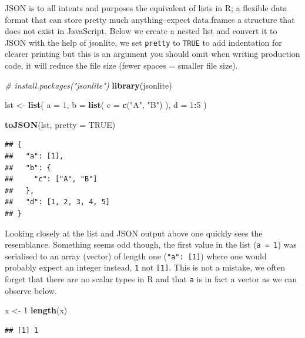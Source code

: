 \documentclass[
]{krantz}
\makeatletter
\newenvironment{Shaded}{\begin{snugshade}}{\end{snugshade}}
\newcommand{\CommentTok}[1]{\textcolor[rgb]{0.37,0.37,0.37}{\textit{#1}}}
\newcommand{\DataTypeTok}[1]{\textcolor[rgb]{0.27,0.27,0.27}{#1}}
\newcommand{\DecValTok}[1]{\textcolor[rgb]{0.06,0.06,0.06}{#1}}
\newcommand{\KeywordTok}[1]{\textcolor[rgb]{0.27,0.27,0.27}{\textbf{#1}}}
\newcommand{\NormalTok}[1]{#1}
\newcommand{\OperatorTok}[1]{\textcolor[rgb]{0.43,0.43,0.43}{\textbf{#1}}}
\newcommand{\OtherTok}[1]{\textcolor[rgb]{0.37,0.37,0.37}{#1}}
\newcommand{\StringTok}[1]{\textcolor[rgb]{0.5,0.5,0.5}{#1}}
\newenvironment{kframe}{%
\medskip{}
\setlength{\fboxsep}{.8em}
 \def\at@end@of@kframe{}%
 \ifinner\ifhmode%
  \def\at@end@of@kframe{\end{minipage}}%
  \begin{minipage}{\columnwidth}%
 \fi\fi%
 \def\FrameCommand##1{\hskip\@totalleftmargin \hskip-\fboxsep
 \colorbox{shadecolor}{##1}\hskip-\fboxsep
     \hskip-\linewidth \hskip-\@totalleftmargin \hskip\columnwidth}%
 \MakeFramed {\advance\hsize-\width
   \@totalleftmargin\z@ \linewidth\hsize
   \@setminipage}}%
 {\par\unskip\endMakeFramed%
 \at@end@of@kframe}
\renewenvironment{Shaded}{\begin{kframe}}{\end{kframe}}
\makeatother
\begin{document}
JSON is to all intents and purposes the equivalent of lists in R; a flexible data format that can store pretty much anything--expect data.frames a structure that does not exist in JavaScript. Below we create a nested list and convert it to JSON with the help of jsonlite, we set \texttt{pretty} to \texttt{TRUE} to add indentation for clearer printing but this is an argument you should omit when writing production code, it will reduce the file size (fewer spaces = smaller file size).

\begin{Shaded}
\begin{Highlighting}[]
\CommentTok{\# install.packages("jsonlite")}
\KeywordTok{library}\NormalTok{(jsonlite)}

\NormalTok{lst \textless{}{-}}\StringTok{ }\KeywordTok{list}\NormalTok{(}
  \DataTypeTok{a =} \DecValTok{1}\NormalTok{,}
  \DataTypeTok{b =} \KeywordTok{list}\NormalTok{(}
    \DataTypeTok{c =} \KeywordTok{c}\NormalTok{(}\StringTok{"A"}\NormalTok{, }\StringTok{"B"}\NormalTok{)}
\NormalTok{  ),}
  \DataTypeTok{d =} \DecValTok{1}\OperatorTok{:}\DecValTok{5}
\NormalTok{)}

\KeywordTok{toJSON}\NormalTok{(lst, }\DataTypeTok{pretty =} \OtherTok{TRUE}\NormalTok{)}
\end{Highlighting}
\end{Shaded}

\begin{verbatim}
## {
##   "a": [1],
##   "b": {
##     "c": ["A", "B"]
##   },
##   "d": [1, 2, 3, 4, 5]
## }
\end{verbatim}

Looking closely at the list and JSON output above one quickly sees the resemblance. Something seems odd though, the first value in the list (\texttt{a\ =\ 1}) was serialised to an array (vector) of length one (\texttt{"a":\ {[}1{]}}) where one would probably expect an integer instead, \texttt{1} not \texttt{{[}1{]}}. This is not a mistake, we often forget that there are no scalar types in R and that \texttt{a} is in fact a vector as we can observe below.

\begin{Shaded}
\begin{Highlighting}[]
\NormalTok{x \textless{}{-}}\StringTok{ }\DecValTok{1}
\KeywordTok{length}\NormalTok{(x)}
\end{Highlighting}
\end{Shaded}

\begin{verbatim}
## [1] 1
\end{verbatim}
\end{document}
